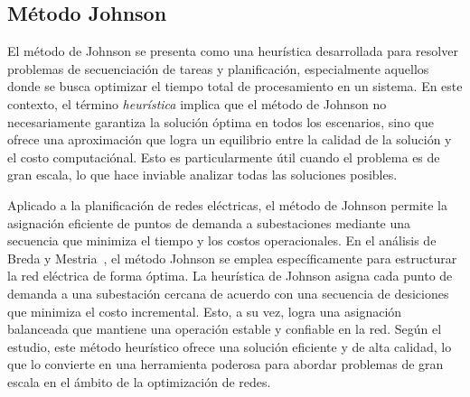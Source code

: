 \documentclass[9pt,a4paper,twoside]{rho-class/rho}
\begin{document}
        \subsection{Método Johnson}
            El método de Johnson se presenta como una heurística desarrollada para resolver problemas de secuenciación de tareas y planificación, especialmente aquellos donde se busca optimizar el tiempo total de procesamiento en un sistema. En este contexto, el término \textit{heurística} implica que el método de Johnson no necesariamente garantiza la solución óptima en todos los escenarios, sino que ofrece una aproximación que logra un equilibrio entre la calidad de la solución y el costo computaciónal. Esto es particularmente útil cuando el problema es de gran escala, lo que hace inviable analizar todas las soluciones posibles.
            \par\medskip            
            Aplicado a la planificación de redes eléctricas, el método de Johnson permite la asignación eficiente de puntos de demanda a subestaciones mediante una secuencia que minimiza el tiempo y los costos operacionales. En el análisis de Breda y Mestria~\cite{Breda2023}, el método Johnson se emplea específicamente para estructurar la red eléctrica de forma óptima. La heurística de Johnson asigna cada punto de demanda a una subestación cercana de acuerdo con una secuencia de desiciones que minimiza el costo incremental. Esto, a su vez, logra una asignación balanceada que mantiene una operación estable y confiable en la red. Según el estudio, este método heurístico ofrece una solución eficiente y de alta calidad, lo que lo convierte en una herramienta poderosa para abordar problemas de gran escala en el ámbito de la optimización de redes.
\end{document}
